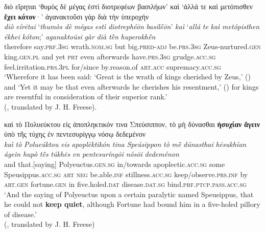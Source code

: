 \documentclass[output=paper,colorlinks,citecolor=brown]{langscibook}
\begin{document}
\ea\label{Ex1}
	\glll διὸ εἴρηται ‘θυμὸς δὲ μέγας ἐστὶ διοτρεφέων βασιλήων’  καὶ ‘ἀλλά τε καὶ μετόπισθεν \textbf{ἔχει} \textbf{κότον}·’ ἀγανακτοῦσι γὰρ διὰ τὴν ὑπεροχήν\\
	\textit{diò} \textit{eírētai} ‘\textit{thumòs} \textit{dè} \textit{mégas} \textit{estì} \textit{diotrephéōn} \textit{basilḗōn}’ \textit{kaì} ‘\textit{allá} \textit{te} \textit{kaì} \textit{metópisthen} \textit{ékhei} \textit{kóton};’ \textit{aganaktoũsi} \textit{gàr} \textit{dià} \textit{tḕn} \textit{huperokhḗn}\\
	therefore say.\textsc{prf.3sg} wrath.\textsc{nom.sg} but big.\textsc{pred-adj} be.\textsc{prs.3sg} Zeus-nurtured.\textsc{gen}	king.\textsc{gen.pl} and yet \textsc{prt} even afterwards have.\textsc{prs.3sg} grudge.\textsc{acc.sg} feel.irritation.\textsc{prs.3pl}	for/since by.reason.of \textsc{art}.\textsc{acc} supremacy.\textsc{acc.sg}\\
	\glt ‘Wherefore it has been said: ‘Great is the wrath of kings cherished by Zeus,’ () and ‘Yet it may be that even afterwards he cherishes his resentment,’ () for kings are resentful in consideration of their superior rank.' \\
 \hspace*{\fill}(, translated by J. H. Freese).
\z

\ea\label{Ex2}
	\glll καὶ τὸ Πολυεύκτου εἰς ἀποπληκτικόν τινα Σπεύσιππον, τὸ μὴ δύνασθαι \textbf{ἡσυχίαν} \textbf{ἄγειν} ὑπὸ τῆς τύχης ἐν πεντεσυρίγγῳ νόσῳ δεδεμένον\\
	\textit{kaì} \textit{tò} \textit{Polueúktou} \textit{eis} \textit{apoplēktikón} \textit{tina} \textit{Speúsippon} \textit{tò} \textit{mḕ} \textit{dúnasthai} \textit{hēsukhían} \textit{ágein} \textit{hupò} \textit{tē̃s} \textit{túkhēs} \textit{en} \textit{pentesuríngōi} \textit{nósōi} \textit{dedeménon}\\
	and that.[saying] Polyeuctus.\textsc{gen.sg} in/towards apoplectic.\textsc{acc.sg} some Speusippus.\textsc{acc.sg} \textsc{art} \textsc{neg} be.able.\textsc{inf} stillness.\textsc{acc.sg} keep/observe.\textsc{prs.inf} by \textsc{art.gen} fortune.\textsc{gen} in five.holed.\textsc{dat} disease.\textsc{dat.sg} bind.\textsc{prf.ptcp.pass.acc.sg}\\
	\glt ‘And the saying of Polyeuctus upon a certain paralytic named Speusippus, that he could not \textbf{keep quiet}, although Fortune had bound him in a five-holed pillory of disease.’ \\
 \hspace*{\fill}(, translated by J. H. Freese) 
\z
\end{document}
